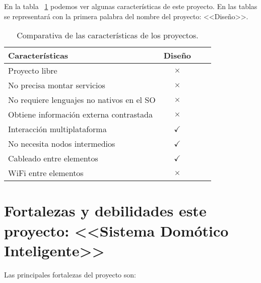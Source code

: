 En la tabla ~\ref{tabla_Diseño} podemos ver algunas características de este proyecto.
En las tablas se representará con la primera palabra del nombre del proyecto: <<Diseño>>.
\begin{table}
\centering
\begin{tabular}{lccc}
\toprule
Características & Diseño  \\
\midrule
Proyecto libre                          & \cellcolor{red!25} {$\times$} \\
No precisa montar servicios             & \cellcolor{red!25} {$\times$} \\
No requiere lenguajes no nativos en el SO  & \cellcolor{red!25} {$\times$} \\
Obtiene información externa contrastada & \cellcolor{red!25} {$\times$} \\
Interacción multiplataforma             & \cellcolor{green!25} {$\checkmark$} \\
No necesita nodos intermedios           & \cellcolor{green!25} {$\checkmark$} \\
Cableado entre elementos                & \cellcolor{green!25} {$\checkmark$} \\
WiFi entre elementos                    & \cellcolor{red!25} {$\times$} \\
\bottomrule
\end{tabular}
\caption{Comparativa de las características de los proyectos.}
\label{tabla_Diseño}
\end{table}

\section{Fortalezas y debilidades este proyecto: <<Sistema Domótico Inteligente>>}

Las principales fortalezas del proyecto son:

